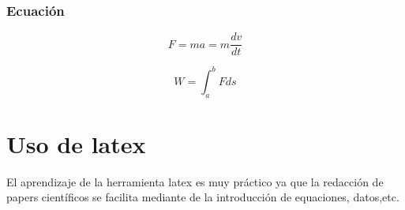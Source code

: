 \documentclass{article}
\begin{document}
\subsubsection{Ecuación}


\begin{equation}
F=ma=m\frac{dv}{dt}
\end{equation}

\begin{equation}
W=\int_{a}^{b}Fds
\end{equation}


\section{Uso de latex }

El aprendizaje de la herramienta latex es muy práctico  ya que la redacción de papers científicos se facilita mediante de la introducción de equaciones, datos,etc.
\end{document}
